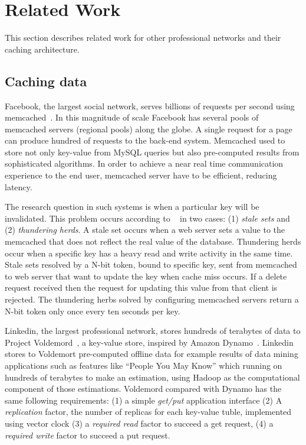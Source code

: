 \section{Related Work}
This section describes related work for other professional networks and their caching architecture.

\subsection{Caching data}
Facebook, the largest social network, serves billions of requests per second using memcached~\cite{nishtala2013scaling}. In this magnitude of scale Facebook has several pools of memcached servers (regional pools) along the globe. A single request for a page can produce hundred of requests to the back-end system. Memcached used to store not only key-value from MySQL queries but also pre-computed results from sophisticated algorithms. 
In order to achieve a near real time communication experience to the end user, memcached server have to be efficient, reducing latency. 

The research question in such systems is when a particular key will be invalidated. This problem occurs according to ~\cite{nishtala2013scaling} in two cases: (1) \emph{stale sets} and (2) \emph{thundering herds}. A stale set occurs when a web server sets a value to the memcached that does not reflect the real value of the database. Thundering herds occur when a specific key has a heavy read and write activity in the same time. Stale sets resolved by a N-bit token, bound to specific key, sent from memcached to web server that want to update the key when cache miss occurs. If a delete request received then the request for updating this value from that client is rejected. The thundering herbs solved by configuring memcached servers return a N-bit token only once every ten seconds per key.

Linkedin, the largest professional network, stores hundreds of terabytes of data to Project Voldemord~\cite{sumbaly2012serving}, a key-value store, inspired by Amazon Dynamo~\cite{decandia2007dynamo}. Linkedin stores to Voldemort pre-computed offline data for example results of data mining applications such as features like ``People You May Know'' which running on hundreds of terabytes to make an estimation, using Hadoop as the computational component of those estimations. 
Voldemord compared with Dynamo has the same following requirements: (1) a simple \emph{get/put} application interface (2) A \emph{replication} factor, the number of replicas for each key-value tuble, implemented using vector clock (3) a \emph{required read} factor to succeed a get request, (4) a \emph{required write} factor to succeed a put request. 


